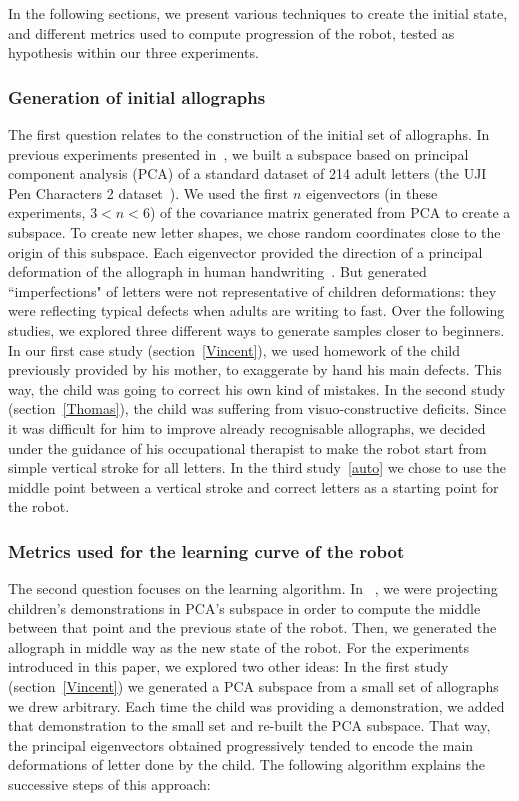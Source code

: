 \documentclass{sig-alternate}
\begin{document}
In the following sections, we present various techniques to
create the initial state, and different metrics used to compute progression of the robot, tested as hypothesis within our three experiments. 

\subsubsection{Generation of initial allographs}
The first question relates to the construction of the initial set of allographs.
In previous experiments presented in~\cite{hood2015when}, we built a subspace based on principal component
analysis (PCA) of a standard dataset of 214 adult letters (the UJI Pen Characters 2 dataset~\cite{Llorens2008}).
We used the first $n$ eigenvectors (in
these experiments, $3 < n < 6$) of the covariance matrix
generated from PCA to create a subspace. To create new letter shapes, we chose
random coordinates close to the origin of this subspace. Each eigenvector
provided the direction of a principal deformation of the allograph in human
handwriting~\cite{Hood}. But generated ``imperfections" of letters were not representative of
children deformations: they were reflecting typical defects when adults are writing to fast. 
Over the following studies, we explored three different ways to generate samples closer to beginners. In our first case study (section~\ref{Vincent}), we used homework of the child previously provided
by his mother, to exaggerate by hand his main defects. This way, the child was
going to correct his own kind of mistakes. In the second study (section~\ref{Thomas}),
the child was suffering from visuo-constructive deficits. Since it was
difficult for him to improve already recognisable allographs, we decided under the
guidance of his occupational therapist to make the robot start from simple
vertical stroke for all letters. In
the third study~\ref{auto} we chose to use the middle point between a vertical stroke
and correct letters as a starting point for the robot. 

\subsubsection{Metrics used for the learning curve of the robot}
The second question focuses on the learning algorithm. In
~\cite{Hood}, we were projecting children's demonstrations in PCA's subspace in order to 
compute the middle between that point and the previous state of the robot. Then, we
generated the allograph in middle way as the new state of
the robot. For the experiments introduced in this paper, we explored two other
ideas: In the first study (section~\ref{Vincent}) we generated a PCA subspace from a
small set of allographs we drew arbitrary. Each time the child was providing a
demonstration, we added that demonstration to the small set and re-built the
PCA subspace. That way, the principal eigenvectors obtained progressively
tended to encode the main deformations of letter done by the child. The following algorithm explains the successive steps of this approach:
\end{document}
